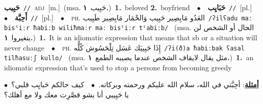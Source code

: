 \documentclass[10pt,a4paper,twoside]{article} %
\begin{document}
\begin{multicols}{2}
{\setlength\topsep{0pt}\textbf{\foreignlanguage{arabic}{حَبِيب}}\ {\color{gray}\texttt{//}\color{black}}\ \textsc{adj}\ [m.]\ \color{gray}(msa. \foreignlanguage{arabic}{حَبِيب}~\foreignlanguage{arabic}{\textbf{١.}})\color{black}\ \textbf{1.}~beloved  \textbf{2.}~boyfriend\ \ $\bullet$\ \ \setlength\topsep{0pt}\textbf{\foreignlanguage{arabic}{حَبَايِب}}\ {\color{gray}\texttt{//}\color{black}}\ [pl.]\ \ $\bullet$\ \ \setlength\topsep{0pt}\textbf{\foreignlanguage{arabic}{أَحِبَّة}}\ {\color{gray}\texttt{//}\color{black}}\ [pl.]\ \ $\bullet$\ \ \textsc{ph.} \color{gray} \foreignlanguage{arabic}{العَدُو مَابِصِير حَبِيب وَالحْمَار مَابِصِير طَبِيب}\color{black}\ {\color{gray}\texttt{/{\sffamily ʔilʕadu maː bisˤiːr ħabiːb wiliħmaːr maː bisˤiːr tˤabiːb}/}\color{black}}\ \color{gray} (msa. \foreignlanguage{arabic}{الحال أو الشخص لن يتغيروا}~\foreignlanguage{arabic}{\textbf{١.}})\color{black}\ \textbf{1.}~It is an idiomatic expression that means that sb or a situation will never change\ \ $\bullet$\ \ \textsc{ph.} \color{gray} \foreignlanguage{arabic}{إِذَا حَبِيبَك عَسَل تِلْحَسُوش كُلُّه}\color{black}\ {\color{gray}\texttt{/{\sffamily ʔi(ð)a ħabiːbak ʕasal tilħasuːʃ kullo}/}\color{black}}\ \color{gray} (msa. \foreignlanguage{arabic}{مثل يقال لايقاف الشخص عندما يصيبه الطمع}~\foreignlanguage{arabic}{\textbf{١.}})\color{black}\ \textbf{1.}~an idiomatic expression that's used to stop a persone from  becoming greedy\  \begin{flushright}\color{gray}\foreignlanguage{arabic}{\textbf{\underline{\foreignlanguage{arabic}{أمثلة}}}: أحِبَّتي في الله، سلام الله عليكم ورحمته وبركاته.\ $\bullet$\ \  كيف حالكم حَبايِب قلبي؟\ $\bullet$\ \  يا حَبِيبي أنا بشو قصَّرِت معك ولا مع أهلك؟}\end{flushright}\color{black}} \vspace{2mm}


\end{multicols}
\end{document}
